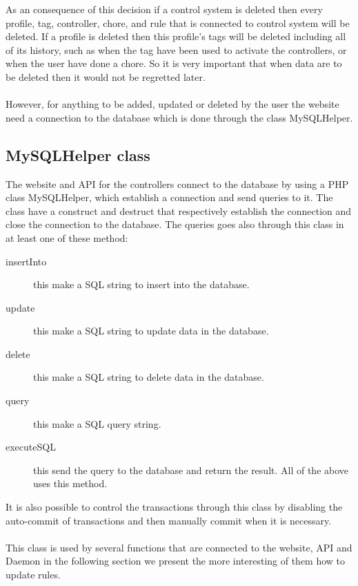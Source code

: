 As an consequence of this decision if a control system is deleted then every profile, tag, controller, chore, and rule that is connected to control system will be deleted. If a profile is deleted then this profile's tags will be deleted including all of its history, such as when the tag have been used to activate the controllers, or when the user have done a chore.
 So it is very important that when data are to be deleted then it would not be regretted later.  \\\\

However, for anything to be added, updated or deleted by the user the website need a connection to the database which is done through the class MySQLHelper. 

\subsection{MySQLHelper class}
The website and API for the controllers connect to the database by using a PHP class MySQLHelper, which establish a connection and send queries to it. The class have a construct and destruct that respectively establish the connection and close the connection to the database. The queries goes also through this class in at least one of these method:

\begin{description}
	\item[insertInto] this make a SQL string to insert into the database.
	\item[update] this make a SQL string to update data in the database.	
	\item[delete] this make a SQL string to delete data in the database.
	\item[query] this make a SQL query string.
	\item[executeSQL] this send the query to the database and return the result. All of the above uses this method.
\end{description}
  
It is also possible to control the transactions through this class by disabling the auto-commit of transactions and then manually commit when it is necessary. \\\\

This class is used by several functions that are connected to the website, API and Daemon in the following section we present the more interesting of them how to update rules. 

